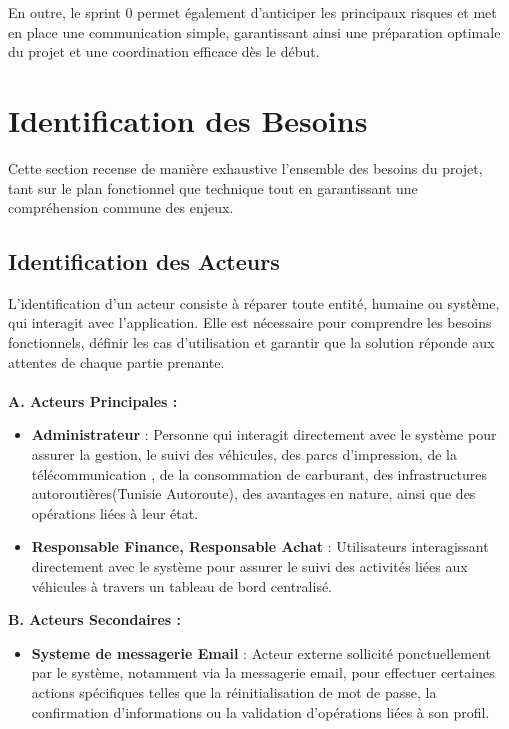 \documentclass[a4paper,11pt]{report}
\begin{document}
En outre, le sprint 0 permet également d'anticiper les principaux risques et met en place une communication simple, garantissant ainsi une préparation optimale du projet et une coordination efficace dès le début.


\section{Identification des Besoins}
Cette section  recense de manière exhaustive l'ensemble des besoins du projet, tant sur le plan fonctionnel que technique tout en garantissant une compréhension commune des enjeux.

\subsection{Identification des Acteurs}
L'identification d'un acteur consiste à réparer toute entité, humaine ou système, qui interagit avec l'application. Elle est nécessaire pour comprendre les besoins fonctionnels, définir les cas d'utilisation et garantir que la solution réponde aux attentes de chaque partie prenante.
\\
\\
\textbf{A. Acteurs Principales : }
\begin{itemize}
	\item \textbf{Administrateur} : Personne qui interagit directement avec le système pour assurer la gestion, le suivi des véhicules, des parcs d'impression, de la télécommunication , de la consommation de carburant, des infrastructures autoroutières(Tunisie Autoroute), des avantages en nature, ainsi que des opérations liées à leur état.
	\item \textbf{Responsable Finance, Responsable Achat} : Utilisateurs interagissant directement avec le système pour assurer le suivi des activités liées aux véhicules à travers un tableau de bord centralisé.
\end{itemize}
\newpage
\textbf{B. Acteurs Secondaires :}

\begin{itemize}
    \item \textbf{Systeme de messagerie Email} : Acteur externe sollicité ponctuellement par le système, notamment via la messagerie email, pour effectuer certaines actions spécifiques telles que la réinitialisation de mot de passe, la confirmation d'informations ou la validation d'opérations liées à son profil.
\end{itemize}
\end{document}
